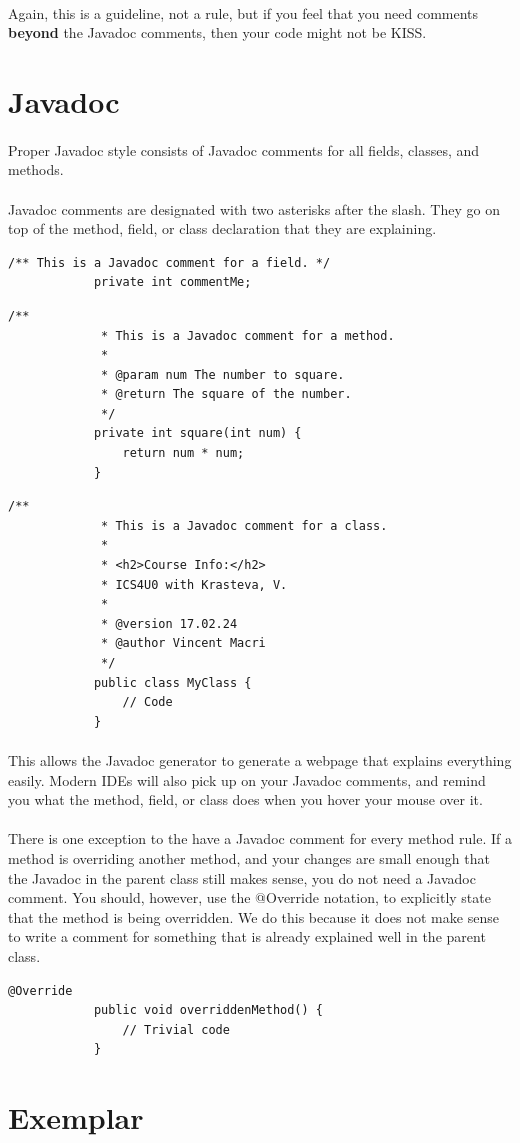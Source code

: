 \documentclass[12pt, letterpaper]{article}
\begin{document}
				\paragraph{}
					Again, this is a guideline, not a rule, but if you feel that you need comments \textbf{beyond} the Javadoc comments, then your code might not be KISS.
	\newpage
	\section{Javadoc}
		\paragraph{}
			Proper Javadoc style consists of Javadoc comments for all fields, classes, and methods.
		\paragraph{}
			Javadoc comments are designated with two asterisks after the slash. They go on top of the method, field, or class declaration that they are explaining.
		\begin{lstlisting}[style=javasnippet]
			/** This is a Javadoc comment for a field. */
			private int commentMe;
		\end{lstlisting}
		\begin{lstlisting}[style=javasnippet]
			/**
			 * This is a Javadoc comment for a method.
			 *
			 * @param num The number to square.
			 * @return The square of the number.
			 */
			private int square(int num) {
				return num * num;
			}
		\end{lstlisting}
		\begin{lstlisting}[style=javasnippet]
			/**
			 * This is a Javadoc comment for a class.
			 * 
			 * <h2>Course Info:</h2>
			 * ICS4U0 with Krasteva, V.
			 * 
			 * @version 17.02.24
			 * @author Vincent Macri
			 */
			public class MyClass {
				// Code
			}
		\end{lstlisting}
		\paragraph{}
			This allows the Javadoc generator to generate a webpage that explains everything easily. Modern IDEs will also pick up on your Javadoc comments, and remind you what the method, field, or class does when you hover your mouse over it.
		\paragraph{}
			There is one exception to the have a Javadoc comment for every method rule. If a method is overriding another method, and your changes are small enough that the Javadoc in the parent class still makes sense, you do not need a Javadoc comment. You should, however, use the @Override notation, to explicitly state that the method is being overridden. We do this because it does not make sense to write a comment for something that is already explained well in the parent class.
		\begin{lstlisting}[style=javasnippet]
			@Override
			public void overriddenMethod() {
				// Trivial code
			}
		\end{lstlisting}
	\newpage
	\section{Exemplar}
		
\end{document}
